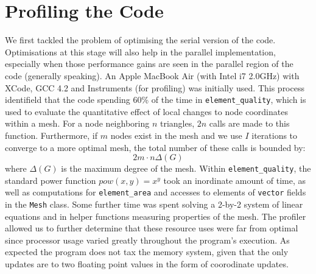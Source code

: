\documentclass[a4paper,11pt, twocolumn]{article}
\begin{document}
\section{Profiling the Code}
We first tackled the problem of optimising the serial version of the code.  Optimisations at this stage will also help in the parallel implementation, especially when those performance gains are seen in the parallel region of the code (generally speaking).  An Apple MacBook Air (with Intel i7 2.0GHz) with XCode, GCC 4.2 and Instruments (for profiling) was initially used.  This process identifield that the code spending 60\% of the time in \verb+element_quality+, which is used to evaluate the quantitative effect of local changes to node coordinates within a mesh.  For a node neighboring $n$ triangles, $2n$ calls are made to this function.  Furthermore, if $m$ nodes exist in the mesh and we use $I$ iterations to converge to a more optimal mesh, the total number of these calls is bounded by:
$$
2m\cdot n\Delta(G)
$$
where $\Delta(G)$ is the maximum degree of the mesh.  Within \verb+element_quality+, the standard power function $pow(x, y) = x^y$ took an inordinate amount of time, as well as computations for \verb+element_area+ and accesses to elements of \verb+vector+ fields in the \verb+Mesh+ class.  Some further time was spent solving a 2-by-2 system of linear equations and in helper functions measuring properties of the mesh.  The profiler allowed us to further determine that these resource uses were far from optimal since processor usage varied greatly throughout the program's execution.  As expected the program does not tax the memory system, given that the only updates are to two floating point values in the form of coorodinate updates.
\end{document}

